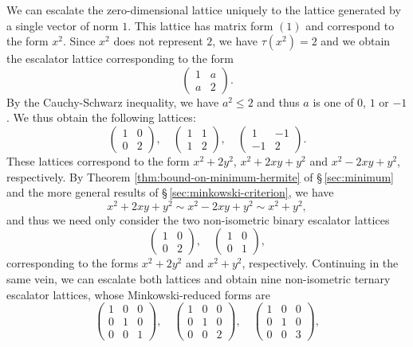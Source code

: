 We can escalate the zero-dimensional lattice uniquely to the lattice generated
by a single vector of norm \(1\). This lattice has matrix form \((1)\) and
correspond to the form \(x^2\). Since \(x^2\) does not represent \(2\), we have
\(\tau(x^2) = 2\) and we obtain the escalator lattice corresponding to the form
\[
    \begin{pmatrix}
        1 & a \\
        a & 2
    \end{pmatrix}.
\]
By the Cauchy-Schwarz inequality, we have \(a^2 \leq 2\) and thus \(a\) is one
of \(0\), \(1\) or \(-1\). We thus obtain the following lattices:
\[
    \begin{pmatrix}
        1 & 0 \\
        0 & 2
    \end{pmatrix}, \quad
    \begin{pmatrix}
        1 & 1 \\
        1 & 2
    \end{pmatrix}, \quad
    \begin{pmatrix}
        1 & -1 \\
        -1 & 2
    \end{pmatrix}.
\]
These lattices correspond to the form \(x^2 + 2y^2\), \(x^2 + 2xy + y^2\) and
\(x^2 - 2xy + y^2\), respectively. By Theorem \ref{thm:bound-on-minimum-hermite}
of \S\,\ref{sec:minimum} and the more general results of
\S\,\ref{sec:minkowski-criterion}, we have
\[
    x^2 + 2xy + y^2 \sim x^2 - 2xy + y^2 \sim x^2 + y^2,
\]  
and thus we need only consider the two non-isometric binary escalator lattices
\begin{equation}
    \label{eqn:binary-escalators}
    \begin{pmatrix}
        1 & 0 \\
        0 & 2
    \end{pmatrix}, \quad
    \begin{pmatrix}
        1 & 0 \\
        0 & 1
    \end{pmatrix},
\end{equation}
corresponding to the forms \(x^2 + 2y^2\) and \(x^2 + y^2\), respectively.
Continuing in the same vein, we can escalate both lattices and obtain nine
non-isometric ternary escalator lattices, whose Minkowski-reduced forms are
\[
    \begin{pmatrix}
        1 & 0 & 0 \\
        0 & 1 & 0 \\
        0 & 0 & 1
    \end{pmatrix}, \quad
    \begin{pmatrix}
        1 & 0 & 0 \\
        0 & 1 & 0 \\
        0 & 0 & 2
    \end{pmatrix}, \quad
    \begin{pmatrix}
        1 & 0 & 0 \\
        0 & 1 & 0 \\
        0 & 0 & 3
    \end{pmatrix},
\]
